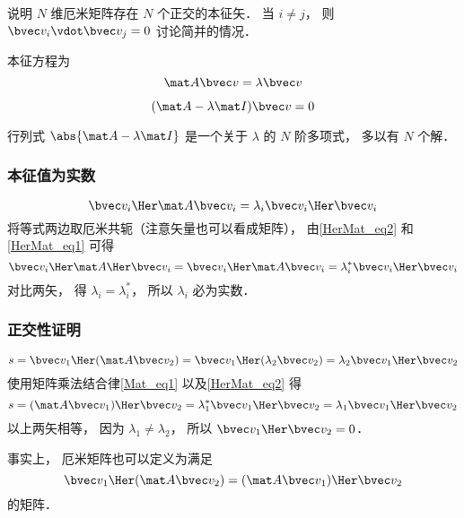 


说明 $N$ 维厄米矩阵存在 $N$ 个正交的本征矢． 当 $i \ne j$， 则 $\bvec v_i \vdot \bvec v_j = 0$ 讨论简并的情况．


本征方程为
\begin{equation}
\mat A \bvec v = \lambda \bvec v
\end{equation}

\begin{equation}
(\mat A - \lambda \mat I) \bvec v = 0
\end{equation}

行列式 $\abs{\mat A - \lambda \mat I}$ 是一个关于 $\lambda$ 的 $N$ 阶多项式， 多以有 $N$ 个解． %


\subsubsection{本征值为实数}
\begin{equation}
\bvec v_i\Her \mat A \bvec v_i = \lambda_i \bvec v_i\Her \bvec v_i
\end{equation}
将等式两边取厄米共轭（注意矢量也可以看成矩阵）， 由\autoref{HerMat_eq2} 和\autoref{HerMat_eq1} 可得
\begin{equation}
\bvec v_i\Her \mat A\Her \bvec v_i = \bvec v_i\Her \mat A \bvec v_i = \lambda_i^* \bvec v_i\Her \bvec v_i
\end{equation}
对比两矢， 得 $\lambda_i = \lambda_i^*$， 所以 $\lambda_i$ 必为实数．

\subsubsection{正交性证明}
\begin{equation}
s = \bvec v_1\Her (\mat A \bvec v_2) = \bvec v_1\Her (\lambda_2 \bvec v_2) = \lambda_2 \bvec v_1\Her \bvec v_2
\end{equation}
使用矩阵乘法结合律\autoref{Mat_eq1} 以及\autoref{HerMat_eq2} 得
\begin{equation}
s = (\mat A \bvec v_1)\Her \bvec v_2 = \lambda_1^* \bvec v_1\Her \bvec v_2 = \lambda_1 \bvec v_1\Her \bvec v_2
\end{equation}
以上两矢相等， 因为 $\lambda_1 \ne \lambda_2$， 所以 $\bvec v_1\Her \bvec v_2 = 0$．

事实上， 厄米矩阵也可以定义为满足
\begin{equation}
\bvec v_1\Her (\mat A \bvec v_2) = (\mat A \bvec v_1)\Her \bvec v_2
\end{equation}
的矩阵．
